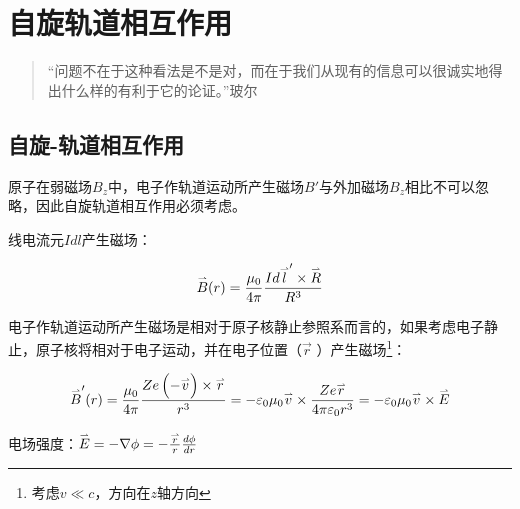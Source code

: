 \section{自旋轨道相互作用}

\begin{quotation}
``问题不在于这种看法是不是对，而在于我们从现有的信息可以很诚实地得出什么样的有利于它的论证。''\qquad 玻尔
\end{quotation}

\subsection{自旋-轨道相互作用}

原子在弱磁场$B_z$中，电子作轨道运动所产生磁场$B'$与外加磁场$B_z$相比不可以忽略，因此自旋轨道相互作用必须考虑。


线电流元$Idl$产生磁场：


\begin{equation}\label{30-1}
\mathord{\buildrel{\lower3pt\hbox{$\scriptscriptstyle\rightharpoonup$}}
\over B} (r) = \frac{{\mu _0 }}{{4\pi }}\frac{{Id\mathord{\buildrel{\lower3pt\hbox{$\scriptscriptstyle\rightharpoonup$}}
\over l'}  \times \mathord{\buildrel{\lower3pt\hbox{$\scriptscriptstyle\rightharpoonup$}}
\over R} }}{{R^3 }}
\end{equation}


电子作轨道运动所产生磁场是相对于原子核静止参照系而言的，如果考虑电子静止，原子核将相对于电子运动，并在电子位置（$\vec r$ ）产生磁场\footnote{考虑$v \ll c$，方向在$z$轴方向}：


\begin{equation}\label{30-2}
\mathord{\buildrel{\lower3pt\hbox{$\scriptscriptstyle\rightharpoonup$}}
\over B} '(r) = \frac{{\mu _0 }}{{4\pi }}\frac{{Ze\left( { - \mathord{\buildrel{\lower3pt\hbox{$\scriptscriptstyle\rightharpoonup$}}
\over v} } \right) \times \mathord{\buildrel{\lower3pt\hbox{$\scriptscriptstyle\rightharpoonup$}}
\over r} }}{{r^3 }} =  - \varepsilon _0 \mu _0 \mathord{\buildrel{\lower3pt\hbox{$\scriptscriptstyle\rightharpoonup$}}
\over v}  \times \frac{{Ze\mathord{\buildrel{\lower3pt\hbox{$\scriptscriptstyle\rightharpoonup$}}
\over r} }}{{4\pi \varepsilon _0 r^3 }} =  - \varepsilon _0 \mu _0 \mathord{\buildrel{\lower3pt\hbox{$\scriptscriptstyle\rightharpoonup$}}
\over v}  \times \mathord{\buildrel{\lower3pt\hbox{$\scriptscriptstyle\rightharpoonup$}}
\over E}
\end{equation}


电场强度：$\mathord{\buildrel{\lower3pt\hbox{$\scriptscriptstyle\rightharpoonup$}}
\over E}  =  - \nabla \phi  =  - \frac{{\mathord{\buildrel{\lower3pt\hbox{$\scriptscriptstyle\rightharpoonup$}}
\over r} }}{r}\frac{{d\phi }}{{dr}}$


